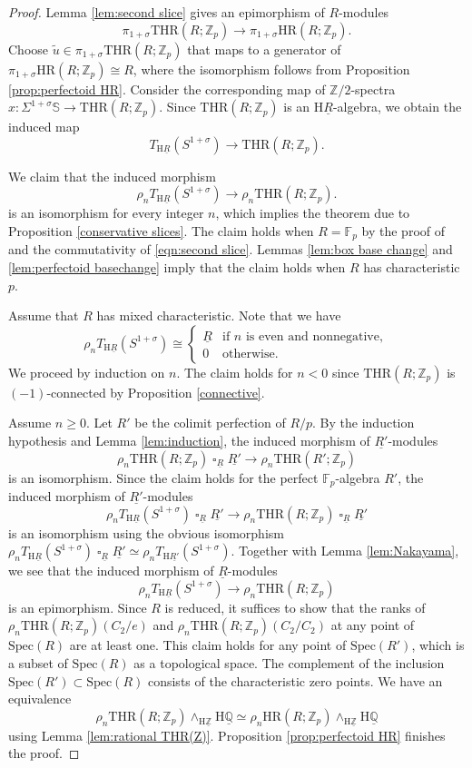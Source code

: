 \documentclass[10pt]{amsart}
\theoremstyle{definition}
\numberwithin{equation}{section}
\newcommand{\F}{\mathbb{F}}
\newcommand{\Q}{\mathbb{Q}}
\newcommand{\Sphere}{\mathbb{S}}
\newcommand{\Z}{\mathbb{Z}}
\newcommand{\rH}{\mathrm{H}}
\newcommand{\ul}{\underline}
\DeclareMathOperator{\sotimes}{\square}
\newcommand{\HR}{\mathrm{HR}}
\newcommand{\THR}{\mathrm{THR}}
\newcommand{\Spec}{\mathrm{Spec}}
\begin{document}
\begin{proof}
Lemma \ref{lem:second slice} gives an epimorphism of $R$-modules
\[
\pi_{1+\sigma}\THR(R;\Z_p)
\to
\pi_{1+\sigma}\HR(R;\Z_p).
\]
Choose $\tilde{u}\in \pi_{1+\sigma}\THR(R;\Z_p)$ that maps to a generator of $\pi_{1+\sigma}\HR(R;\Z_p)\cong R$,
where the isomorphism follows from Proposition \ref{prop:perfectoid HR}.
Consider the corresponding map of $\Z/2$-spectra $x\colon \Sigma^{1+\sigma}\Sphere\to \THR(R;\Z_p)$.
Since $\THR(R;\Z_p)$ is an $\rH \ul{R}$-algebra,
we obtain the induced map
\[
T_{\rH \ul{R}}(S^{1+\sigma})
\to
\THR(R;\Z_p).
\]




We claim that the induced morphism
\[
\rho_n T_{\rH \ul{R}}(S^{1+\sigma})
\to
\rho_n\THR(R;\Z_p).
\]
is an isomorphism for every integer $n$,
which implies the theorem due to Proposition \ref{conservative slices}.
The claim holds when $R=\F_p$ by the proof of \cite[Theorem 5.15]{DMPR21} and the commutativity of \eqref{eqn:second slice}.
Lemmas \ref{lem:box base change} and \ref{lem:perfectoid basechange} imply
that the claim holds when $R$ has characteristic $p$.

Assume that $R$ has mixed characteristic.
Note that we have
\[
\rho_n T_{\rH \ul{R}}(S^{1+\sigma})
\cong
\left\{
\begin{array}{ll}
\ul{R}  & \text{if $n$ is even and nonnegative},
\\
0 & \text{otherwise}.
\end{array}
\right.
\]
We proceed by induction on $n$.
The claim holds for $n<0$ since $\THR(R;\Z_p)$ is $(-1)$-connected by Proposition \ref{connective}.

Assume $n\geq 0$.
Let $R'$ be the colimit perfection of $R/p$.
By the induction hypothesis
and Lemma \ref{lem:induction},
the induced morphism of $\ul{R'}$-modules
\[
\rho_n\THR(R;\Z_p)\sotimes_{\ul{R}} \ul{R'}
\to
\rho_n\THR(R';\Z_p)
\]
is an isomorphism.
Since the claim holds for the perfect $\F_p$-algebra $R'$,
the induced morphism of $\ul{R'}$-modules
\[
\rho_n T_{\rH \ul{R}}(S^{1+\sigma})\sotimes_{\ul{R}}\ul{R'}
\to
\rho_n \THR(R;\Z_p)\sotimes_{\ul{R}} \ul{R'}
\]
is an isomorphism using the obvious isomorphism $\rho_n T_{\rH \ul{R}}(S^{1+\sigma}) \sotimes_{\ul{R}}\ul{R'}\simeq \rho_n T_{\rH \ul{R'}}(S^{1+\sigma})$.
Together with Lemma \ref{lem:Nakayama},
we see that the induced morphism of $\ul{R}$-modules
\[
\rho_n T_{\rH \ul{R}}(S^{1+\sigma}) \to \rho_n\THR(R;\Z_p)
\]
is an epimorphism.
Since $R$ is reduced,
it suffices to show that the ranks of $\rho_n\THR(R;\Z_p)(C_2/e)$ and $\rho_n\THR(R;\Z_p)(C_2/C_2)$ at
any point of $\Spec(R)$ are at least one.
This claim holds for any point of $\Spec(R')$, which is a subset of $\Spec(R)$ as a topological space.
The complement of the inclusion $\Spec(R')\subset \Spec(R)$ consists of the characteristic zero points.
We have an equivalence
\[
\rho_n\THR(R;\Z_p)\wedge_{\rH \ul{\Z}} \rH \ul{\Q}
\simeq
\rho_n\HR(R;\Z_p)\wedge_{\rH \ul{\Z}} \rH \ul{\Q}
\]
using Lemma \ref{lem:rational THR(Z)}.
Proposition \ref{prop:perfectoid HR} finishes the proof.
\end{proof}
\end{document}
